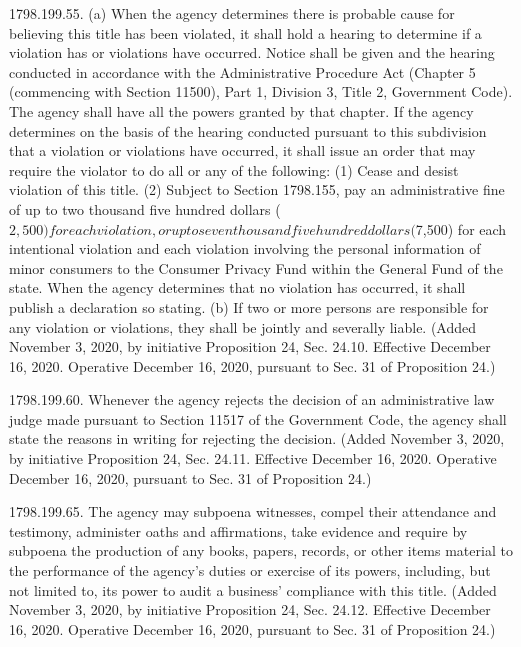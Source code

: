 1798.199.55.  (a) When the agency determines there is probable cause for believing this title has been violated, it shall hold a hearing to determine if a violation has or violations have occurred. Notice shall be given and the hearing conducted in accordance with the Administrative Procedure Act (Chapter 5 (commencing with Section 11500), Part 1, Division 3, Title 2, Government Code). The agency shall have all the powers granted by that chapter. If the agency determines on the basis of the hearing conducted pursuant to this subdivision that a violation or violations have occurred, it shall issue an order that may require the violator to do all or any of the following:
(1) Cease and desist violation of this title.
(2) Subject to Section 1798.155, pay an administrative fine of up to two thousand five hundred dollars ($2,500) for each violation, or up to seven thousand five hundred dollars ($7,500) for each intentional violation and each violation involving the personal information of minor consumers to the Consumer Privacy Fund within the General Fund of the state. When the agency determines that no violation has occurred, it shall publish a declaration so stating.
(b) If two or more persons are responsible for any violation or violations, they shall be jointly and severally liable.
(Added November 3, 2020, by initiative Proposition 24, Sec. 24.10. Effective December 16, 2020. Operative December 16, 2020, pursuant to Sec. 31 of Proposition 24.)

1798.199.60.  Whenever the agency rejects the decision of an administrative law judge made pursuant to Section 11517 of the Government Code, the agency shall state the reasons in writing for rejecting the decision.
(Added November 3, 2020, by initiative Proposition 24, Sec. 24.11. Effective December 16, 2020. Operative December 16, 2020, pursuant to Sec. 31 of Proposition 24.)

1798.199.65.  The agency may subpoena witnesses, compel their attendance and testimony, administer oaths and affirmations, take evidence and require by subpoena the production of any books, papers, records, or other items material to the performance of the agency’s duties or exercise of its powers, including, but not limited to, its power to audit a business’ compliance with this title.
(Added November 3, 2020, by initiative Proposition 24, Sec. 24.12. Effective December 16, 2020. Operative December 16, 2020, pursuant to Sec. 31 of Proposition 24.)

